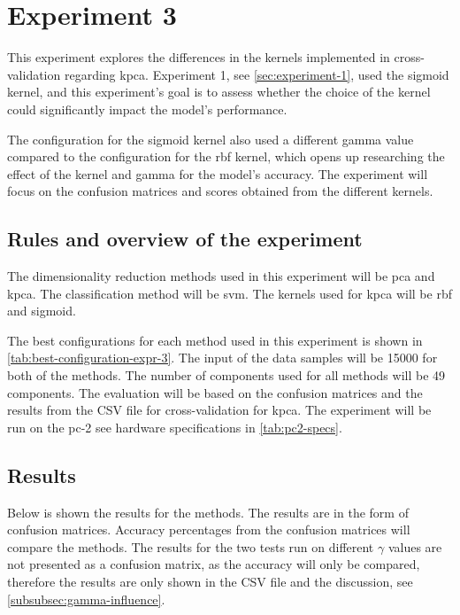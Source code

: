 \section{Experiment 3}\label{sec:experiment-3}
This experiment explores the differences in the kernels implemented in cross-validation regarding \gls{kpca}. Experiment 1, see \autoref{sec:experiment-1}, used the sigmoid kernel, and this experiment's goal is to assess whether the choice of the kernel could significantly impact the model's performance.

The configuration for the sigmoid kernel also used a different gamma value compared to the configuration for the \gls{rbf} kernel, which opens up researching the effect of the kernel and gamma for the model's accuracy. The experiment will focus on the confusion matrices and scores obtained from the different kernels.


\subsection{Rules and overview of the experiment}
The dimensionality reduction methods used in this experiment will be \gls{pca} and \gls{kpca}. The classification method will be \gls{svm}. The kernels used for \gls{kpca} will be \gls{rbf} and sigmoid.

The best configurations for each method used in this experiment is shown in \autoref{tab:best-configuration-expr-3}. The input of the data samples will be 15000 for both of the methods. The number of components used for all methods will be 49 components. The evaluation will be based on the confusion matrices and the results from the CSV file for cross-validation for \gls{kpca}. The experiment will be run on the pc-2 see hardware specifications in \autoref{tab:pc2-specs}.



\subsection{Results}\label{subsec:experiment-3-results}
Below is shown the results for the methods. The results are in the form of confusion matrices. Accuracy percentages from the confusion matrices will compare the methods. The results for the two tests run on different $\gamma$ values are not presented as a confusion matrix, as the accuracy will only be compared, therefore the results are only shown in the CSV file and the discussion, see \autoref{subsubsec:gamma-influence}.

